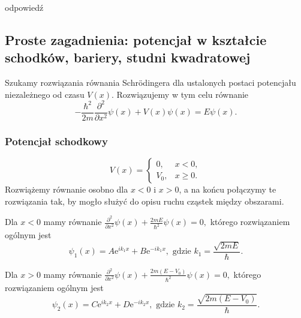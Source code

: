 odpowiedź

\subsection{Proste zagadnienia: potencjał w kształcie schodków, bariery, studni kwadratowej}
Szukamy rozwiązania równania Schrödingera dla ustalonych postaci potencjału niezależnego od czasu $V(x)$. Rozwiązujemy w tym celu równanie
\begin{equation*}
	-\frac{\hbar^2}{2m} \frac{\partial^2}{\partial x^2} \psi(x) + V(x)\psi(x) = E\psi(x).
\end{equation*}

\subsubsection*{Potencjał schodkowy}
\begin{equation*}
	V(x) = \begin{cases}
		0, &x < 0,\\
		V_0, &x \geq 0.
	\end{cases}
\end{equation*}
Rozwiążemy równanie osobno dla $x < 0$ i $x > 0$, a na końcu połączymy te rozwiązania tak, by mogło służyć do opisu ruchu cząstek między obszarami.

Dla $x < 0$ mamy równanie $\frac{\partial^2}{\partial x^2} \psi(x) + \frac{2mE}{\hbar^2}\psi(x) = 0,$ którego rozwiązaniem ogólnym jest 
\begin{equation*}
	\psi_1(x) = A \mathrm{e}^{i k_1 x} + B \mathrm{e}^{-i k_1 x}, \text{ gdzie } k_1 = \frac{\sqrt{2mE}}{\hbar}.
\end{equation*}

Dla $x > 0$ mamy równanie $\frac{\partial^2}{\partial x^2} \psi(x) + \frac{2m(E - V_0)}{\hbar^2}\psi(x) = 0,$ którego rozwiązaniem ogólnym jest 
\begin{equation*}
	\psi_2(x) = C \mathrm{e}^{i k_2 x} + D \mathrm{e}^{-i k_2 x}, \text{ gdzie } k_2= \frac{\sqrt{2m(E - V_0)}}{\hbar}.
\end{equation*}

